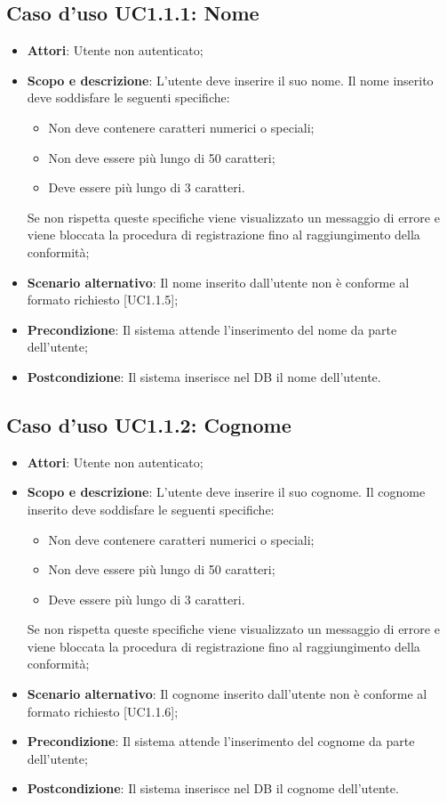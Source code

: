 \documentclass[12pt,a4paper,titlepage]{article}
\begin{document}
	\subsection{Caso d'uso UC1.1.1: Nome}
	\label{UC1.1.1}
	\begin{itemize}
		\item \textbf{Attori}: Utente non autenticato; 
		\item \textbf{Scopo e descrizione}: L'utente deve inserire il suo nome. Il nome inserito deve soddisfare le seguenti specifiche:
		\begin{itemize}
			\item Non deve contenere caratteri numerici o speciali;
			\item Non deve essere più lungo di 50 caratteri;
			\item Deve essere più lungo di 3 caratteri.
		\end{itemize}
		Se non rispetta queste specifiche viene visualizzato un messaggio di errore e viene bloccata la procedura di registrazione fino al raggiungimento della conformità;
		\item \textbf{Scenario alternativo}: Il nome inserito dall'utente non è conforme al formato richiesto [UC1.1.5];
		\item \textbf{Precondizione}: Il sistema attende l'inserimento del nome da parte dell'utente;
		\item \textbf{Postcondizione}: Il sistema inserisce nel DB il nome dell'utente.
	\end{itemize}
	\subsection{Caso d'uso UC1.1.2: Cognome}
	\label{UC1.1.2}
	\begin{itemize}
		\item \textbf{Attori}: Utente non autenticato;
		\item \textbf{Scopo e descrizione}: L'utente deve inserire il suo cognome. Il cognome inserito deve soddisfare le seguenti specifiche:
		\begin{itemize}
			\item Non deve contenere caratteri numerici o speciali;
			\item Non deve essere più lungo di 50 caratteri;
			\item Deve essere più lungo di 3 caratteri.
		\end{itemize}
		Se non rispetta queste specifiche viene visualizzato un messaggio di errore e viene bloccata la procedura di registrazione fino al raggiungimento della conformità;
		\item \textbf{Scenario alternativo}: Il cognome inserito dall'utente non è conforme al formato richiesto [UC1.1.6];
		\item \textbf{Precondizione}: Il sistema attende l'inserimento del cognome da parte dell'utente;
		\item \textbf{Postcondizione}: Il sistema inserisce nel DB il cognome dell'utente.
	\end{itemize}
\end{document}
